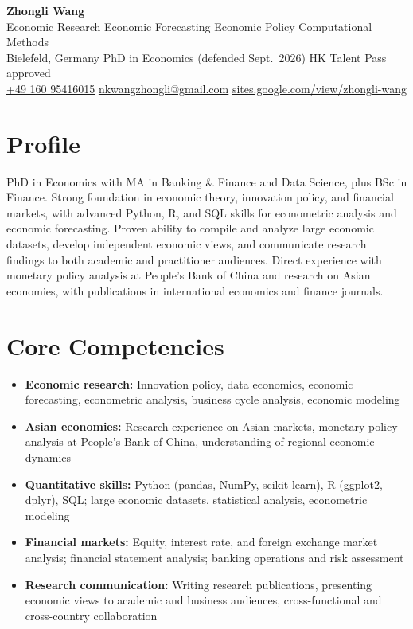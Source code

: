 \documentclass[a4paper,11pt]{article}
\begin{document}
\begin{center}
  {\LARGE\textbf{\textcolor{accent}{Zhongli Wang}}}\\[3pt]
  {\large Economic Research \textbar{} Economic Forecasting \textbar{} Economic Policy \textbar{} Computational Methods}\\[3pt]
  Bielefeld, Germany \textbar{} PhD in Economics (defended Sept.\ 2026) \textbar{} HK Talent Pass approved\\[2pt]
  \href{tel:+4916095416015}{+49 160 95416015} \textbar{}
  \href{mailto:nkwangzhongli@gmail.com}{nkwangzhongli@gmail.com} \textbar{}
  \href{https://sites.google.com/view/zhongli-wang/}{sites.google.com/view/zhongli-wang}
\end{center}

\section{Profile}
PhD in Economics with MA in Banking \& Finance and Data Science, plus BSc in Finance. Strong foundation in economic theory, innovation policy, and financial markets, with advanced Python, R, and SQL skills for econometric analysis and economic forecasting. Proven ability to compile and analyze large economic datasets, develop independent economic views, and communicate research findings to both academic and practitioner audiences. Direct experience with monetary policy analysis at People's Bank of China and research on Asian economies, with publications in international economics and finance journals.

\section{Core Competencies}
\begin{itemize}
  \item \textbf{Economic research:} Innovation policy, data economics, economic forecasting, econometric analysis, business cycle analysis, economic modeling
  \item \textbf{Asian economies:} Research experience on Asian markets, monetary policy analysis at People's Bank of China, understanding of regional economic dynamics
  \item \textbf{Quantitative skills:} Python (pandas, NumPy, scikit-learn), R (ggplot2, dplyr), SQL; large economic datasets, statistical analysis, econometric modeling
  \item \textbf{Financial markets:} Equity, interest rate, and foreign exchange market analysis; financial statement analysis; banking operations and risk assessment
  \item \textbf{Research communication:} Writing research publications, presenting economic views to academic and business audiences, cross-functional and cross-country collaboration
\end{itemize}
\end{document}
